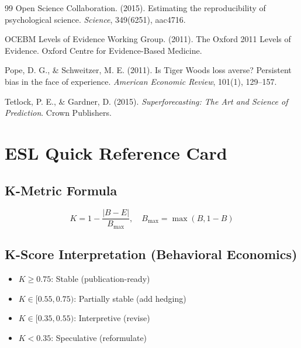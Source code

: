 \documentclass[11pt,a4paper]{article}
\begin{document}
\begin{thebibliography}{99}
Open Science Collaboration. (2015).
Estimating the reproducibility of psychological science.
\textit{Science}, 349(6251), aac4716.

OCEBM Levels of Evidence Working Group. (2011).
The Oxford 2011 Levels of Evidence.
Oxford Centre for Evidence-Based Medicine.

Pope, D. G., \& Schweitzer, M. E. (2011).
Is Tiger Woods loss averse? Persistent bias in the face of experience.
\textit{American Economic Review}, 101(1), 129--157.

Tetlock, P. E., \& Gardner, D. (2015).
\textit{Superforecasting: The Art and Science of Prediction}.
Crown Publishers.

\end{thebibliography}


\appendix
\section{ESL Quick Reference Card}

\subsection{K-Metric Formula}
\begin{equation}
K = 1 - \frac{|B - E|}{B_{\max}}, \quad B_{\max} = \max(B, 1-B)
\end{equation}

\subsection{K-Score Interpretation (Behavioral Economics)}
\begin{itemize}
    \item $K \geq 0.75$: Stable (publication-ready)
    \item $K \in [0.55, 0.75)$: Partially stable (add hedging)
    \item $K \in [0.35, 0.55)$: Interpretive (revise)
    \item $K < 0.35$: Speculative (reformulate)
\end{itemize}
\end{document}
